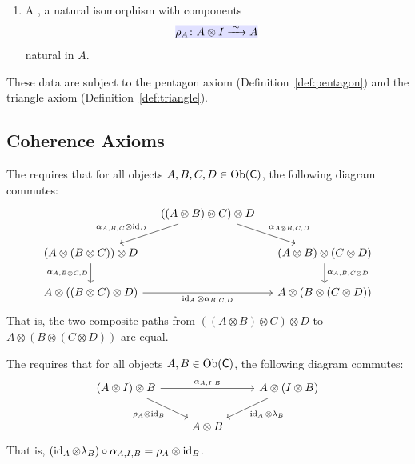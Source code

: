 \documentclass[../preamble]{subfiles}
\begin{document}
\begin{definition}
\begin{enumerate}
    \item A ,
      a natural isomorphism with components
      \begin{equation}
        \label{eq:right-unitor}
        \newmath{\rho_A \colon A \otimes I \xrightarrow{\;\sim\;} A}
      \end{equation}
      natural in $A$.
  \end{enumerate}

  These data are subject to the pentagon axiom
  (Definition~\ref{def:pentagon})
  and the triangle axiom
  (Definition~\ref{def:triangle}).
\end{definition}

\subsection{Coherence Axioms}

\begin{definition}
  \label{def:pentagon}
  The  requires that
  for all objects $A, B, C, D \in \operatorname{Ob}(\mathsf{C})$,
  the following diagram commutes:
  \begin{equation}
    \label{eq:pentagon}
    \begin{tikzcd}[column sep=small]
      & ((A \otimes B) \otimes C) \otimes D
        \arrow[dl, "\alpha_{A,B,C} \otimes \id_D"']
        \arrow[dr, "\alpha_{A \otimes B, C, D}"]
      & \\
      (A \otimes (B \otimes C)) \otimes D
        \arrow[d, "\alpha_{A, B \otimes C, D}"']
      & &
      (A \otimes B) \otimes (C \otimes D)
        \arrow[d, "\alpha_{A, B, C \otimes D}"]
      \\
      A \otimes ((B \otimes C) \otimes D)
        \arrow[rr, "\id_A \otimes \alpha_{B,C,D}"']
      & &
      A \otimes (B \otimes (C \otimes D))
    \end{tikzcd}
  \end{equation}
  That is,
  the two composite paths from
  $((A \otimes B) \otimes C) \otimes D$
  to
  $A \otimes (B \otimes (C \otimes D))$
  are equal.
\end{definition}

\begin{definition}
  \label{def:triangle}
  The  requires that
  for all objects $A, B \in \operatorname{Ob}(\mathsf{C})$,
  the following diagram commutes:
  \begin{equation}
    \label{eq:triangle}
    \begin{tikzcd}
      (A \otimes I) \otimes B
        \arrow[rr, "\alpha_{A,I,B}"]
        \arrow[dr, "\rho_A \otimes \id_B"']
      & &
      A \otimes (I \otimes B)
        \arrow[dl, "\id_A \otimes \lambda_B"]
      \\
      & A \otimes B &
    \end{tikzcd}
  \end{equation}
  That is,
  $(\operatorname{id}_A \otimes \lambda_B) \circ \alpha_{A,I,B}
    = \rho_A \otimes \operatorname{id}_B$.
\end{definition}
\end{document}
